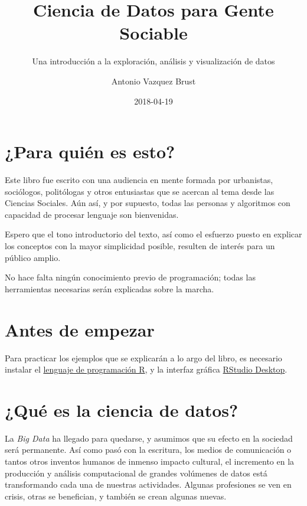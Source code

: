 \documentclass[]{book}
\title{Ciencia de Datos para Gente Sociable}
\subtitle{Una introducción a la exploración, análisis y visualización de datos}
\author{Antonio Vazquez Brust}
\date{2018-04-19}
\begin{document}
\maketitle

{
\setcounter{tocdepth}{1}
\tableofcontents
}
\chapter*{¿Para quién es esto?}\label{para-quien-es-esto}

Este libro fue escrito con una audiencia en mente formada por
urbanistas, sociólogos, politólogas y otros entusiastas que se acercan
al tema desde las Ciencias Sociales. Aún así, y por supuesto, todas las
personas y algoritmos con capacidad de procesar lenguaje son
bienvenidas.

Espero que el tono introductorio del texto, así como el esfuerzo puesto
en explicar los conceptos con la mayor simplicidad posible, resulten de
interés para un público amplio.

No hace falta ningún conocimiento previo de programación; todas las
herramientas necesarias serán explicadas sobre la marcha.

\chapter*{Antes de empezar}\label{antes-de-empezar}

Para practicar los ejemplos que se explicarán a lo argo del libro, es
necesario instalar el \href{https://cloud.r-project.org/}{lenguaje de
programación R}, y la interfaz gráfica
\href{https://www.rstudio.com/products/rstudio/download/}{RStudio
Desktop}.

\chapter{¿Qué es la ciencia de datos?}\label{que-es-la-ciencia-de-datos}

La \emph{Big Data} ha llegado para quedarse, y asumimos que su efecto en
la sociedad será permanente. Así como pasó con la escritura, los medios
de comunicación o tantos otros inventos humanos de inmenso impacto
cultural, el incremento en la producción y análisis computacional de
grandes volúmenes de datos está transformando cada una de nuestras
actividades. Algunas profesiones se ven en crisis, otras se benefician,
y también se crean algunas nuevas.
\end{document}
